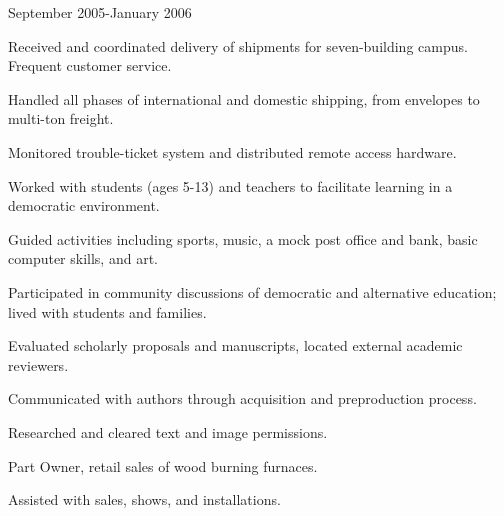\documentclass[letterpaper]{cv_brennen}
\begin{document}
            {September 2005-January 2006}

\begin{compactitem}
\item Received and coordinated delivery of shipments for seven-building campus.
      Frequent customer service.
\item Handled all phases of international and domestic shipping, from envelopes
      to multi-ton freight.
\item Monitored trouble-ticket system and distributed remote access hardware.
\end{compactitem}


\begin{compactitem}
\item Worked with students (ages 5-13) and teachers to facilitate learning in a
      democratic environment.
\item Guided activities including sports, music, a mock post office and bank,
      basic computer skills, and art.
\item Participated in community discussions of democratic and alternative
      education; lived with students and families.
\end{compactitem}


\begin{compactitem}
\item Evaluated scholarly proposals and manuscripts, located external academic
      reviewers.
\item Communicated with authors through acquisition and preproduction process.
\item Researched and cleared text and image permissions.
\end{compactitem}


\begin{compactitem}
\item Part Owner, retail sales of wood burning furnaces.
\item Assisted with sales, shows, and installations.
\end{compactitem}
\end{document}
